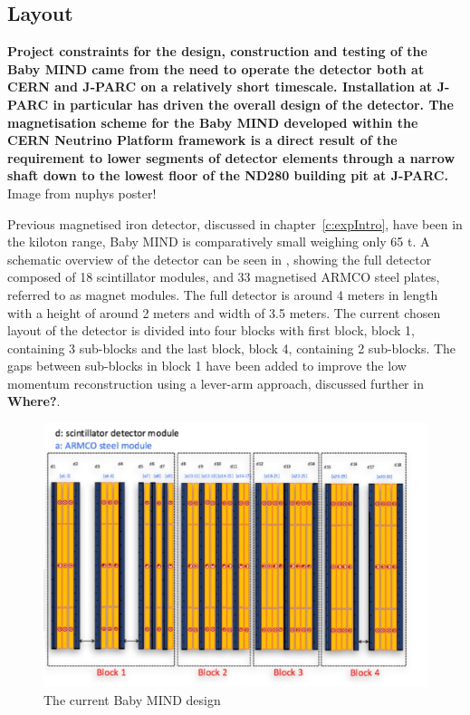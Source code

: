 
\subsection{Layout}
\textbf{Project constraints for the design, construction and testing of the Baby MIND came from the need to operate the detector both at CERN and J-PARC on a relatively short timescale. Installation at J-PARC in particular has driven the overall design of the detector. The magnetisation scheme for the Baby MIND developed within the CERN Neutrino Platform framework is a direct result of the requirement to lower segments of detector elements through a narrow shaft down to the lowest floor of the ND280 building pit at J-PARC. } Image from nuphys poster!

Previous magnetised iron detector, discussed in chapter~\ref{c:expIntro}, have been in the kiloton range, Baby MIND is comparatively small weighing only 65 t. A schematic overview of the detector can be seen in , showing the full detector composed of 18 scintillator modules, and 33 magnetised ARMCO steel plates, referred to as magnet modules. The full detector is around 4 meters in length with a height of around 2 meters and width of 3.5 meters. The current chosen layout of the detector is divided into four blocks with first block, block 1, containing 3 sub-blocks and the last block, block 4, containing 2 sub-blocks. The gaps between sub-blocks in block 1 have been added to improve the low momentum reconstruction using a lever-arm approach, discussed further in \textbf{Where?}.


\begin{figure}[h!]
\centering
\includegraphics[width=\textwidth]{figures/MIND.jpeg}
\caption{The current Baby MIND design}
\label{fig:design}
\end{figure}

